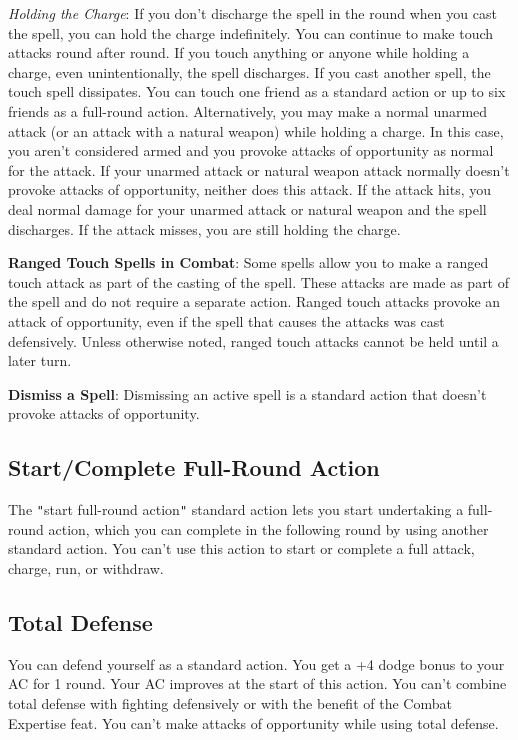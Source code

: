\textit{Holding the Charge}: If you don't discharge the spell in the round when you cast the spell, you can hold the charge indefinitely. You can continue to make touch attacks round after round. If you touch anything or anyone while holding a charge, even unintentionally, the spell discharges. If you cast another spell, the touch spell dissipates. You can touch one friend as a standard action or up to six friends as a full-round action. Alternatively, you may make a normal unarmed attack (or an attack with a natural weapon) while holding a charge. In this case, you aren't considered armed and you provoke attacks of opportunity as normal for the attack. If your unarmed attack or natural weapon attack normally doesn't provoke attacks of opportunity, neither does this attack. If the attack hits, you deal normal damage for your unarmed attack or natural weapon and the spell discharges. If the attack misses, you are still holding the charge.
				
\textbf{Ranged Touch Spells in Combat}: Some spells allow you to make a ranged touch attack as part of the casting of the spell. These attacks are made as part of the spell and do not require a separate action. Ranged touch attacks provoke an attack of opportunity, even if the spell that causes the attacks was cast defensively. Unless otherwise noted, ranged touch attacks cannot be held until a later turn. 
				
\textbf{Dismiss a Spell}: Dismissing an active spell is a standard action that doesn't provoke attacks of opportunity.
				
\subsection{Start/Complete Full-Round Action}

				
The \texttt{{}"{}}start full-round action\texttt{{}"{}} standard action lets you start undertaking a full-round action, which you can complete in the following round by using another standard action. You can't use this action to start or complete a full attack, charge, run, or withdraw.
				
\subsection{Total Defense}

				
You can defend yourself as a standard action. You get a +4 dodge bonus to your AC for 1 round. Your AC improves at the start of this action. You can't combine total defense with fighting defensively or with the benefit of the Combat Expertise feat. You can't make attacks of opportunity while using total defense.
				
